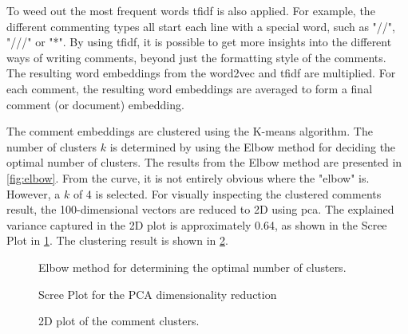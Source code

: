 To weed out the most frequent words \acrshort{tfidf} is also applied. For example, the different commenting types all start each line with a special word, such as "//", "///" or "*". By using \acrshort{tfidf}, it is possible to get more insights into the different ways of writing comments, beyond just the formatting style of the comments. The resulting word embeddings from the word2vec and \acrshort{tfidf} are multiplied. For each comment, the resulting word embeddings are averaged to form a final comment (or document) embedding.

The comment embeddings are clustered using the K-means algorithm. The number of clusters \(k\) is determined by using the Elbow method for deciding the optimal number of clusters. The results from the Elbow method are presented in \cref{fig:elbow}. From the curve, it is not entirely obvious where the "elbow" is. However, a \(k\) of 4 is selected. For visually inspecting the clustered comments result, the 100-dimensional vectors are reduced to 2D using \acrfull{pca}. The explained variance captured in the 2D plot is approximately 0.64, as shown in the Scree Plot in \cref{fig:scree-plot}. The clustering result is shown in \cref{fig:comment-clusters}.


\begin{figure}[htbp]
    \centering
    
    \caption{Elbow method for determining the optimal number of clusters.}
    \label{fig:elbow}
    \vspace*{\floatsep}%
    
    \caption{Scree Plot for the PCA dimensionality reduction}
    \label{fig:scree-plot}
\end{figure}


\begin{figure}[htbp]
    \centering
    
    \caption{2D plot of the comment clusters.}
    \label{fig:comment-clusters}
\end{figure}

